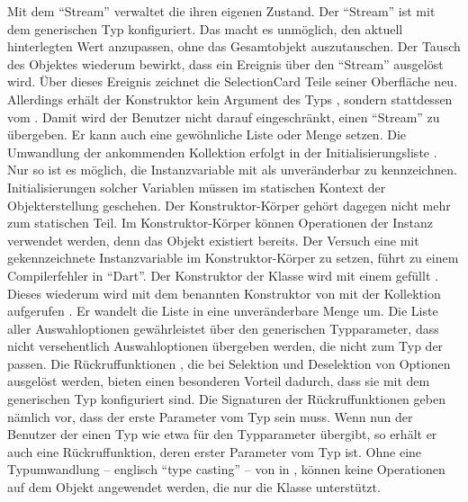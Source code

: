 Mit dem \enquote{Stream}  verwaltet die  ihren eigenen Zustand.
Der \enquote{Stream} ist mit dem generischen Typ  konfiguriert.
Das macht es unmöglich, den aktuell hinterlegten Wert anzupassen, ohne das Gesamtobjekt auszutauschen.
Der Tausch des Objektes wiederum bewirkt, dass ein Ereignis über den \enquote{Stream} ausgelöst wird. Über dieses Ereignis zeichnet die SelectionCard Teile seiner Oberfläche neu.
Allerdings erhält der Konstruktor kein Argument des Typs , sondern stattdessen vom  .
Damit wird der Benutzer nicht darauf eingeschränkt, einen \enquote{Stream} zu übergeben.
Er kann auch eine gewöhnliche Liste oder Menge setzen.
Die Umwandlung der ankommenden Kollektion erfolgt in der Initialisierungsliste .
Nur so ist es möglich, die Instanzvariable mit  als unveränderbar zu kennzeichnen.
Initialisierungen solcher Variablen müssen im statischen Kontext der Objekterstellung geschehen.
Der Konstruktor-Körper gehört dagegen nicht mehr zum statischen Teil.
Im Konstruktor-Körper können Operationen der Instanz verwendet werden, denn das Objekt existiert bereits.
Der Versuch eine mit  gekennzeichnete Instanzvariable im Konstruktor-Körper zu setzen, führt zu einem Compilerfehler in \enquote{Dart}.
Der Konstruktor  der Klasse  wird mit einem  gefüllt .
Dieses wiederum wird mit dem benannten Konstruktor  von  mit der Kollektion aufgerufen .
Er wandelt die  Liste in eine unveränderbare Menge um.
Die Liste aller Auswahloptionen   gewährleistet über den generischen Typparameter, dass nicht versehentlich Auswahloptionen übergeben werden, die nicht zum Typ der  passen.
Die Rückruffunktionen , die bei Selektion und Deselektion von Optionen ausgelöst werden, bieten einen besonderen Vorteil dadurch, dass sie mit dem generischen Typ konfiguriert sind.
Die Signaturen der Rückruffunktionen  geben nämlich vor, dass der erste Parameter vom Typ  sein muss.
Wenn nun der Benutzer der  einen Typ wie etwa  für den Typparameter übergibt, so erhält er auch eine Rückruffunktion, deren erster Parameter vom Typ  ist.
Ohne eine Typumwandlung -- englisch \enquote{type casting} -- von  in , können keine Operationen auf dem Objekt angewendet werden, die nur die Klasse  unterstützt.

